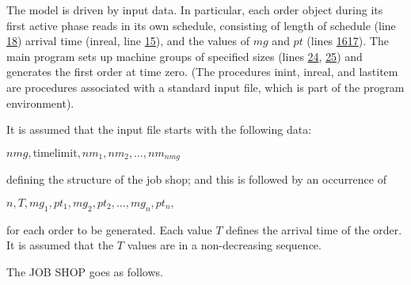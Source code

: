The model is driven by input data. In particular, each order object during its first active phase reads in its own schedule, consisting of length of schedule (line \hyperref[pg:program-job-shop-18]{18}) arrival time (inreal, line \hyperref[pg:program-job-shop-15]{15}), and the values of $mg$ and $pt$ (lines \hyperref[pg:program-job-shop-16]{16}\textendash\hyperref[pg:program-job-shop-17]{17}). The main program sets up machine groups of specified sizes (lines \hyperref[pg:program-job-shop-24]{24}, \hyperref[pg:program-job-shop-25]{25}) and generates the first order at time zero. (The procedures inint, inreal, and lastitem are procedures associated with a standard input file, which is part of the program environment).

It is assumed that the input file starts with the following data:

\quad $nmg, \text{timelimit}, nm_1, nm_2, \dots, nm_{nmg}$

\noindent
defining the structure of the job shop; and this is followed by an occurrence of

\quad $n, T, mg_1, pt_1, mg_2, pt_2, \dots, mg_n, pt_n,$

for each order to be generated. Each value $T$ defines the arrival time of the order. It is assumed that the $T$ values are in a non-decreasing sequence.

The JOB SHOP goes as follows.

